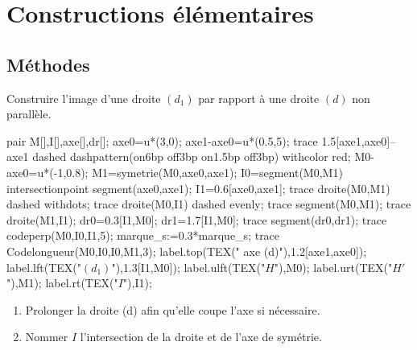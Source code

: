 \section{Constructions élémentaires}
    \subsection{Méthodes}
    \begin{methode*1}
        \exercice
        Construire l'image d'une droite $(d_1)$ par rapport à une droite $(d)$ non parallèle.
        \correction
        \begin{minipage}{0.35\linewidth}
            \begin{center}
                \begin{Geometrie}[CoinHD={(6u,4u)},CoinBG={(0,0)}]
                    pair M[],I[],axe[],dr[];
                    axe0=u*(3,0);
                    axe1-axe0=u*(0.5,5);                
                    trace 1.5[axe1,axe0]--axe1 dashed dashpattern(on6bp off3bp on1.5bp off3bp) withcolor red;
                    M0-axe0=u*(-1,0.8);
                    M1=symetrie(M0,axe0,axe1);
                    I0=segment(M0,M1) intersectionpoint segment(axe0,axe1);
                    I1=0.6[axe0,axe1];
                    trace droite(M0,M1) dashed withdots;
                    trace droite(M0,I1) dashed evenly;
                    trace segment(M0,M1);
                    trace droite(M1,I1);
                    dr0=0.3[I1,M0];
                    dr1=1.7[I1,M0];
                    trace segment(dr0,dr1);                
                    trace codeperp(M0,I0,I1,5);
                    marque_s:=0.3*marque_s;
                    trace Codelongueur(M0,I0,I0,M1,3);
                    label.top(TEX("{\color{red} axe (d)}"),1.2[axe1,axe0]);                
                    label.lft(TEX("$(d_1)$"),1.3[I1,M0]);
                    label.ulft(TEX("$H$"),M0);
                    label.urt(TEX("$H'$"),M1);
                    label.rt(TEX("$I$"),I1);
                \end{Geometrie}
            \end{center}
        \end{minipage}
        \begin{minipage}{0.65\linewidth}
            \begin{enumerate}
                \item Prolonger la droite (d) afin qu'elle coupe l'axe si nécessaire.
                \item Nommer $I$ l'intersection de la droite et de l'axe de symétrie.

\end{enumerate}
\end{minipage}
\end{methode*1}
